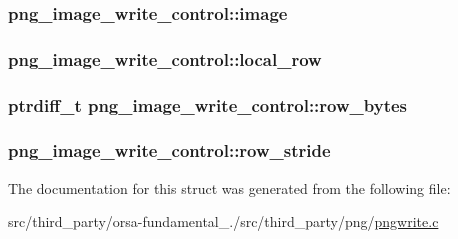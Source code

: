 \subsubsection[{image}]{ png\+\_\+image\+\_\+write\+\_\+control\+::image}\label{structpng__image__write__control_a5187b99ed3fd962d802e0e9c3a61f4ee}
\hypertarget{structpng__image__write__control_a5942b04084bbf48607b6ae67fef7195d}{}
\subsubsection[{local\+\_\+row}]{ png\+\_\+image\+\_\+write\+\_\+control\+::local\+\_\+row}\label{structpng__image__write__control_a5942b04084bbf48607b6ae67fef7195d}
\hypertarget{structpng__image__write__control_ad5026b060a45346d968b08b76d40b66c}{}
\subsubsection[{row\+\_\+bytes}]{\setlength{\rightskip}{0pt plus 5cm}ptrdiff\+\_\+t png\+\_\+image\+\_\+write\+\_\+control\+::row\+\_\+bytes}\label{structpng__image__write__control_ad5026b060a45346d968b08b76d40b66c}
\hypertarget{structpng__image__write__control_aa7da32d072dbaf2d06bf4eea1a800114}{}
\subsubsection[{row\+\_\+stride}]{ png\+\_\+image\+\_\+write\+\_\+control\+::row\+\_\+stride}\label{structpng__image__write__control_aa7da32d072dbaf2d06bf4eea1a800114}


The documentation for this struct was generated from the following file\+:\begin{DoxyCompactItemize}
\item 
src/third\+\_\+party/orsa-\/fundamental\+\_./src/third\+\_\+party/png/\hyperlink{pngwrite_8c}{pngwrite.\+c}\end{DoxyCompactItemize}
